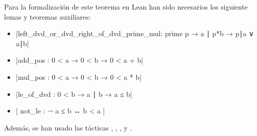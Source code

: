Para la formalización de este teorema en Lean han sido necesarios los
siguiente lemas y teoremas auxiliares:
\begin{itemize}
\item {}|left_dvd_or_dvd_right_of_dvd_prime_mul: prime p → a ∣ p*b → p∣a ∨ a∣b|
\item {}|add_pos : 0 < a → 0 < b → 0 < a + b|
\item {}|mul_pos : 0 < a → 0 < b → 0 < a * b|
\item {}|le_of_dvd : 0 < b → a ∣ b → a ≤ b|
\item {}| not_le : ¬ a ≤ b ↔ b < a |
\end{itemize}

Además, se han usado las tácticas
,
,
,
 y
.

